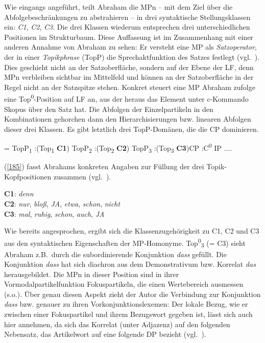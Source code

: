 Wie eingangs angeführt, teilt Abraham die MPn – mit dem Ziel über die Abfolgebeschränkungen zu abstrahieren – in drei syntaktische Stellungsklassen ein: \textit{C1}, \textit{C2}, \textit{C3}. Die drei Klassen wiederum entsprechen drei unterschiedlichen Positionen im Strukturbaum. Diese Auffassung ist im Zusammenhang mit einer anderen Annahme von Abraham zu sehen: Er versteht eine  MP als \textit{Satzoperator}, der in einer \textit{Topikphrase} (TopP) die Sprechaktfunktion des Satzes festlegt (vgl.\ \citealt[96--97]{Abraham1995}). Dies geschieht nicht an der Satzoberfläche, sondern auf der Ebene  der LF, denn MPn verbleiben sichtbar im Mittelfeld und können an der Satzoberfläche in der Regel nicht an der Satzspitze stehen. Konkret steuert eine MP Abraham zufolge eine Top\textsuperscript{0}-Position auf LF an, aus der heraus das Element unter c-Kommando  Skopus über den Satz hat. Die Abfolgen der Einzelpartikeln in den Kombinationen gehorchen dann den Hierarchisierungen bzw. linearen Abfolgen dieser drei Klassen. Es gibt letztlich drei TopP-Domänen, die die CP dominieren.

\begin{exe}
	\ex\label{184}   
\begin{jtree}
\! = {TopP\textsubscript{1}}
:({Top{\textsubscript{1}}} {\textbf{C1}}) {TopP\textsubscript{2}}
:({Top{\textsubscript{2}}} {\textbf{C2}}) {TopP\textsubscript{3}}
:({{Top{\textsubscript{3}}}} {\textbf{C3}}){CP}
:{C\textsuperscript{0}} {IP} {...}.
\end{jtree}
\end{exe}
(\ref{185}) fasst Abrahams konkreten Angaben zur Füllung der drei To\-pik-Kopf\-po\-si\-ti\-o\-nen zusammen (vgl.\ \citeyear[103]{Abraham1995}).
	
\begin{exe}
	\ex\label{185}   
		\textbf{C1}: \textit{denn}\\
		\textbf{C2}: \textit{nur}, \textit{bloß}, \textit{JA}, \textit{etwa}, \textit{schon}, \textit{nicht}\\
		\textbf{C3}: \textit{mal}, \textit{ruhig}, \textit{schon}, \textit{auch}, \textit{JA}
\end{exe}	
Wie bereits angesprochen, ergibt sich die Klassenzugehörigkeit zu C1, C2 und C3 aus den syntaktischen Eigenschaften der  MP-Homonyme. Top\textsuperscript{0}\textsubscript{3} (= C3) sieht Abraham z.B.\ durch die subordinierende Konjunktion \textit{dass} gefüllt. Die Konjunktion \textit{dass} hat sich diachron aus dem Demonstrativum bzw. Korrelat \textit{das} herausgebildet. Die MPn in dieser Position sind in ihrer Vormodalpartikelfunktion  Fokuspartikeln, die einen  Wertebereich ausmessen (s.o.). Über genau diesen Aspekt zieht der Autor die Verbindung zur Konjunktion \textit{dass} bzw. genauer zu ihren Vorkonjunktionslexemen: Der lokale Bezug, wie er zwischen einer Fokuspartikel und ihrem Bezugswort gegeben ist, lässt sich auch hier annehmen, da sich das Kor\-relat  (unter Adjazenz) auf den folgenden Nebensatz, das Artikelwort auf eine folgende DP bezieht (vgl.\ \citealt[105--106]{Abraham1995}). 

